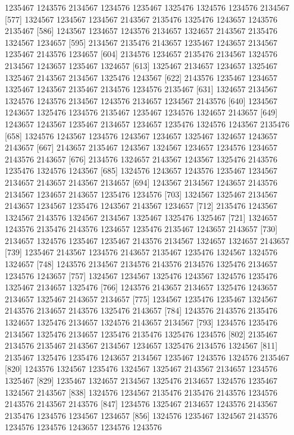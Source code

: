 \documentclass{scrartcl}
\begin{document}
\begin{Schunk}
\begin{Soutput}
 [568] 1235467 1243576 2134567 1234576 1235467 1325476 1324576 1234576 2134567
 [577] 1324567 1234567 1234567 2143567 2135476 1325476 1243657 1243576 2135467
 [586] 1243567 1234657 1243576 2134657 1324657 2143567 2135476 1324567 1234657
 [595] 2134567 2135476 2143657 1235467 1243657 2134567 1235467 2143576 1234657
 [604] 2134576 1234657 2135476 2134567 1324576 2134567 1243657 1235467 1324657
 [613] 1325467 2134657 1234657 1325467 1325467 2143567 2134567 1325476 1243567
 [622] 2143576 1235467 1234657 1325467 1243567 2135467 2134576 1234576 2135467
 [631] 1324657 2134567 1324576 1243576 2134567 1243576 2134657 1234567 2143576
 [640] 1234567 1243657 1325476 1234576 2135467 1235467 1234576 1324657 2143657
 [649] 1243657 1243567 1235467 2134657 1234657 1235476 1324576 1243567 2135476
 [658] 1324576 1243567 1234576 1243567 1234657 1325467 1324657 1243657 2143657
 [667] 2143657 2135467 1243567 1324567 1234657 1234576 1234657 2143576 2143657
 [676] 2134576 1324657 2143567 1243567 1325476 2143576 1235476 1324576 1243567
 [685] 1324576 1243657 1243576 1235467 1234567 2134657 2143657 2143567 2134657
 [694] 1243567 2134567 1243657 2143576 2134567 1234657 2143657 1235476 1234576
 [703] 1324567 1325467 2134567 2143657 1234567 1235476 1243567 2143567 1234657
 [712] 2135476 1243567 1324567 2143576 1324567 2134567 1325467 1325476 1325467
 [721] 1324657 1243576 2135476 2143576 1234657 1235476 2135467 1243657 2143657
 [730] 2134657 1324576 1235467 1235467 2143576 2134567 1324657 1324657 2143657
 [739] 1235467 2143567 1234576 2143657 2135467 1235476 1324567 1324576 1324657
 [748] 1243576 2134567 2134576 2143576 2134576 1325476 2134657 1234576 1243657
 [757] 1324567 1234567 1325476 1243567 1324576 1235476 1325467 2134657 1325476
 [766] 1243576 2143657 2134657 1325476 1243657 2134657 1325467 2143657 2134657
 [775] 1234567 1235476 1235467 1324567 2143576 2134657 2143576 1325476 2143657
 [784] 1243576 2143576 2135476 1324657 1325476 2134657 1324576 2143657 2134567
 [793] 1234576 1235476 2134567 1325476 2134657 1235476 2135476 1325476 1234576
 [802] 2135467 2134576 2135467 2143567 2134567 1234657 1325476 2134576 1324567
 [811] 2135467 1325476 1235476 1243657 2134567 1235467 1243576 1324576 2135467
 [820] 1243576 1324567 1235476 1324567 1325467 2143567 2134657 1234576 1325467
 [829] 1235467 1324657 2134567 1325476 2134657 1324576 1235467 1324567 2143567
 [838] 1324576 1234567 2135476 2135476 2143576 1234576 2143576 2143567 2143576
 [847] 1234576 1325467 2134657 1243576 2143567 2135476 1234576 1234567 1234657
 [856] 1324576 1235467 1324567 2143576 1234576 1234576 1243657 1234576 1243576

\end{Soutput}
\end{Schunk}
\end{document}
